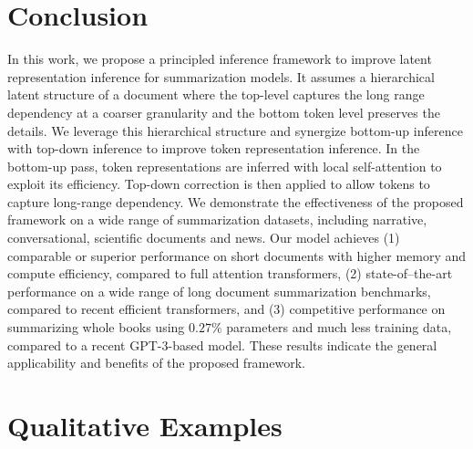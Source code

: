 \documentclass{article} \usepackage{iclr2022_conference,times}
\begin{document}
\section{Conclusion}
In this work, we propose a principled inference framework to improve latent representation inference for summarization models. It assumes a hierarchical latent structure of a document where the top-level captures the long range dependency at a coarser granularity and the bottom token level preserves the details. We leverage this hierarchical structure and synergize bottom-up inference with top-down inference to improve token representation inference. In the bottom-up pass, token representations are inferred with local self-attention to exploit its efficiency. Top-down correction is then applied to allow tokens to capture long-range dependency. We demonstrate the effectiveness of the proposed framework on a wide range of summarization datasets, including narrative, conversational, scientific documents and news. Our model achieves (1) comparable or superior performance on short documents with higher memory and compute efficiency, compared to full attention transformers, (2) state-of--the-art performance on a wide range of long document summarization benchmarks, compared to recent efficient transformers, and (3) competitive performance on summarizing whole books using $0.27\%$ parameters and much less training data, compared to a recent GPT-3-based model. These results indicate the general applicability and benefits of the proposed framework. 





\clearpage
\appendix
\section{Qualitative Examples}
\end{document}
